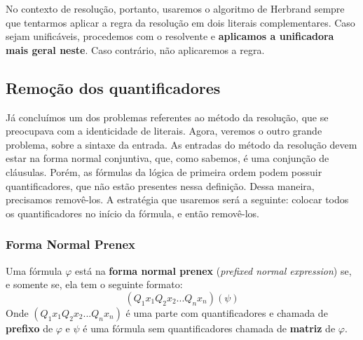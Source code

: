 No contexto de resolução, portanto, usaremos o algoritmo de Herbrand sempre que tentarmos aplicar a regra da resolução em dois literais complementares. Caso sejam unificáveis, procedemos com o resolvente e \textbf{aplicamos a unificadora mais geral neste}. Caso contrário, não aplicaremos a regra.

\subsection{Remoção dos quantificadores}
Já concluímos um dos problemas referentes ao método da resolução, que se preocupava com a identicidade de literais. Agora, veremos o outro grande problema, sobre a sintaxe da entrada. As entradas do método da resolução devem estar na forma normal conjuntiva, que, como sabemos, é uma conjunção de cláusulas. Porém, as fórmulas da lógica de primeira ordem podem possuir quantificadores, que não estão presentes nessa definição. Dessa maneira, precisamos removê-los. A estratégia que usaremos será a seguinte: colocar todos os quantificadores no início da fórmula, e então removê-los.

\subsubsection{Forma Normal Prenex}
Uma fórmula $\varphi$ está na \textbf{forma normal prenex} (\textit{prefixed normal expression}) se, e somente se, ela tem o seguinte formato:
\[(Q_1 x_1Q_2 x_2...Q_n x_n)(\psi)\]
Onde $(Q_1 x_1Q_2 x_2...Q_n x_n)$ é uma parte com quantificadores e chamada de \textbf{prefixo} de $\varphi$ e $\psi$ é uma fórmula sem quantificadores chamada de \textbf{matriz} de $\varphi$.

